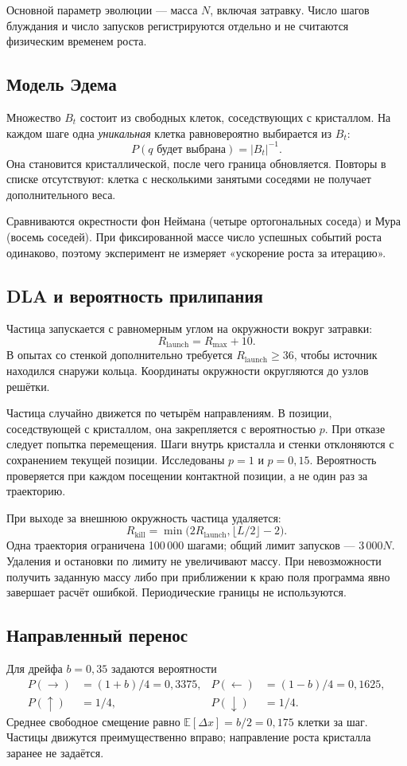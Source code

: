 \documentclass[12pt,a4paper]{article}
\begin{document}
Основной параметр эволюции --- масса $N$, включая затравку. Число шагов
блуждания и число запусков регистрируются отдельно и не считаются физическим
временем роста.

\subsection{Модель Эдема}
Множество $B_t$ состоит из свободных клеток, соседствующих с кристаллом.
На каждом шаге одна \emph{уникальная} клетка равновероятно выбирается из $B_t$:
\[
 P(q\text{ будет выбрана})=|B_t|^{-1}.
\]
Она становится кристаллической, после чего граница обновляется.
Повторы в списке отсутствуют: клетка с несколькими занятыми соседями не получает
дополнительного веса.

Сравниваются окрестности фон Неймана (четыре ортогональных соседа) и Мура
(восемь соседей). При фиксированной массе число успешных событий роста одинаково,
поэтому эксперимент не измеряет «ускорение роста за итерацию».

\subsection{DLA и вероятность прилипания}
Частица запускается с равномерным углом на окружности вокруг затравки:
\[
 R_{\mathrm{launch}}=R_{\max}+10.
\]
В опытах со стенкой дополнительно требуется $R_{\mathrm{launch}}\geq36$,
чтобы источник находился снаружи кольца. Координаты окружности округляются
до узлов решётки.

Частица случайно движется по четырём направлениям. В позиции, соседствующей
с кристаллом, она закрепляется с вероятностью $p$. При отказе следует попытка
перемещения. Шаги внутрь кристалла и стенки отклоняются с сохранением текущей
позиции. Исследованы $p=1$ и $p=0{,}15$. Вероятность проверяется при каждом
посещении контактной позиции, а не один раз за траекторию.

При выходе за внешнюю окружность частица удаляется:
\[
 R_{\mathrm{kill}}=\min\bigl(2R_{\mathrm{launch}},\lfloor L/2\rfloor-2\bigr).
\]
Одна траектория ограничена 100\,000 шагами; общий лимит запусков ---
$3\,000N$. Удаления и остановки по лимиту не увеличивают массу. При невозможности
получить заданную массу либо при приближении к краю поля программа явно
завершает расчёт ошибкой. Периодические границы не используются.

\subsection{Направленный перенос}
Для дрейфа $b=0{,}35$ задаются вероятности
\begin{align*}
P(\rightarrow)&=(1+b)/4=0{,}3375,& P(\leftarrow)&=(1-b)/4=0{,}1625,\\
P(\uparrow)&=1/4,&P(\downarrow)&=1/4.
\end{align*}
Среднее свободное смещение равно $\mathbb E[\Delta x]=b/2=0{,}175$ клетки
за шаг. Частицы движутся преимущественно вправо; направление роста кристалла
заранее не задаётся.
\end{document}
